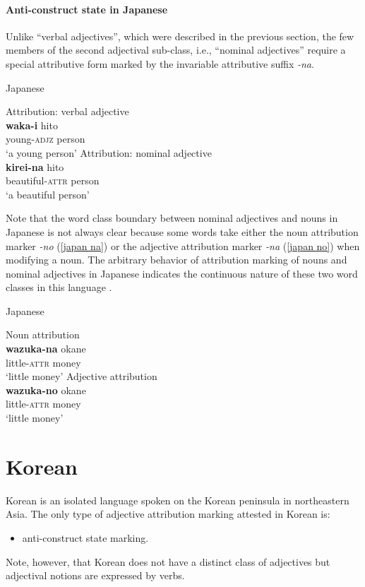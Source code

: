 \paragraph*{Anti\hyp{}construct state in Japanese}
Unlike “verbal adjectives”, which were described in the previous section, the few members of the second adjectival sub-class, i.e., “nominal adjectives” require a special attributive form marked by the invariable attributive suffix \textit{-na}.
\begin{exe}
\ex \rm{Japanese \citep[72–81]{pustet1989}}%
\begin{xlist}
\ex \rm{Attribution: verbal adjective}\\
\gll	\textbf{waka-i} hito\\
	young-\textsc{adjz} person\\
\glt	‘a young person’
\ex \rm{Attribution: nominal adjective}\\
\gll	\textbf{kirei-na} hito\\
	beautiful-\textsc{attr} person\\
\glt	‘a beautiful person’
\end{xlist}
\end{exe}
Note that the word class boundary between nominal adjectives and nouns in Japanese is not always clear because some words take either the noun attribution marker \textit{-no} (\ref{japan na}) or the adjective attribution marker \textit{-na} (\ref{japan no}) when modifying a noun. The arbitrary behavior of attribution marking of nouns and nominal adjectives in Japanese indicates the continuous nature of these two word classes in this language \citep[79–80]{pustet1989}.
\begin{exe}
\ex \rm{Japanese \citep[72–81]{pustet1989}}
\begin{xlist}
\ex \rm{Noun attribution}\\
\label{japan na}
\gll	\textbf{wazuka-na} okane\\
	little-\textsc{attr} money\\
\glt	‘little money’
\ex \rm{Adjective attribution}\\
\label{japan no}
\gll	\textbf{wazuka-no} okane\\
	little-\textsc{attr} money\\
\glt	‘little money’
\end{xlist}
\end{exe}

\section{Korean}
Korean is an isolated language spoken on the Korean peninsula in northeastern Asia. The only type of adjective attribution marking attested in Korean is:
\begin{itemize}
\item anti\hyp{}construct state marking.
\end{itemize}
Note, however, that Korean does not have a distinct class of adjectives but adjectival notions are expressed by verbs.

